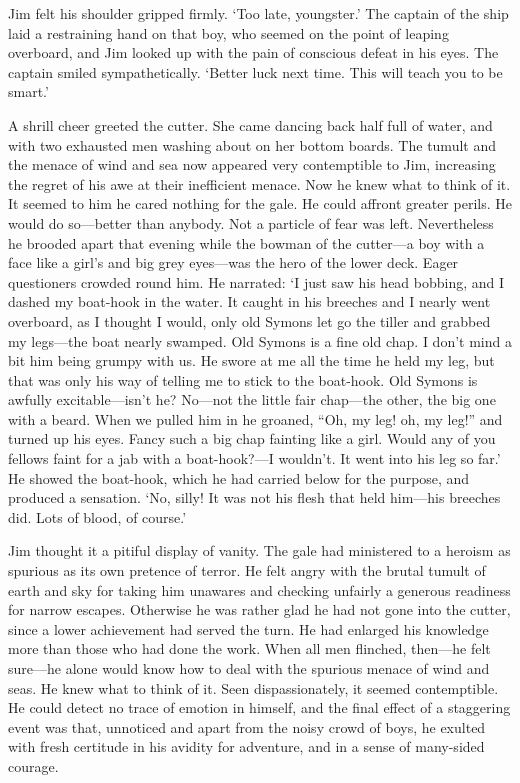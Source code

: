 Jim felt his shoulder gripped firmly. ‘Too late, youngster.’ The captain of the ship laid a restraining hand on that boy, who seemed on the point of leaping overboard, and Jim looked up with the pain of conscious defeat in his eyes. The captain smiled sympathetically. ‘Better luck next time. This will teach you to be smart.’

A shrill cheer greeted the cutter. She came dancing back half full of water, and with two exhausted men washing about on her bottom boards. The tumult and the menace of wind and sea now appeared very contemptible to Jim, increasing the regret of his awe at their inefficient menace. Now he knew what to think of it. It seemed to him he cared nothing for the gale. He could affront greater perils. He would do so—better than anybody. Not a particle of fear was left. Nevertheless he brooded apart that evening while the bowman of the cutter—a boy with a face like a girl’s and big grey eyes—was the hero of the lower deck. Eager questioners crowded round him. He narrated: ‘I just saw his head bobbing, and I dashed my boat-hook in the water. It caught in his breeches and I nearly went overboard, as I thought I would, only old Symons let go the tiller and grabbed my legs—the boat nearly swamped. Old Symons is a fine old chap. I don’t mind a bit him being grumpy with us. He swore at me all the time he held my leg, but that was only his way of telling me to stick to the boat-hook. Old Symons is awfully excitable—isn’t he? No—not the little fair chap—the other, the big one with a beard. When we pulled him in he groaned, “Oh, my leg! oh, my leg!” and turned up his eyes. Fancy such a big chap fainting like a girl. Would any of you fellows faint for a jab with a boat-hook?—I wouldn’t. It went into his leg so far.’ He showed the boat-hook, which he had carried below for the purpose, and produced a sensation. ‘No, silly! It was not his flesh that held him—his breeches did. Lots of blood, of course.’

Jim thought it a pitiful display of vanity. The gale had ministered to a heroism as spurious as its own pretence of terror. He felt angry with the brutal tumult of earth and sky for taking him unawares and checking unfairly a generous readiness for narrow escapes. Otherwise he was rather glad he had not gone into the cutter, since a lower achievement had served the turn. He had enlarged his knowledge more than those who had done the work. When all men flinched, then—he felt sure—he alone would know how to deal with the spurious menace of wind and seas. He knew what to think of it. Seen dispassionately, it seemed contemptible. He could detect no trace of emotion in himself, and the final effect of a staggering event was that, unnoticed and apart from the noisy crowd of boys, he exulted with fresh certitude in his avidity for adventure, and in a sense of many-sided courage.